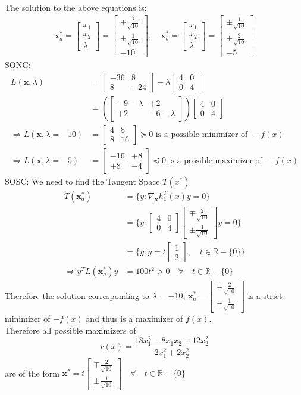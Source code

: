 \documentclass[a4paper,11pt]{article}
\newcommand{\V}[1]{\boldsymbol{#1}}
\newcommand{\mat}[1]{\begin{bmatrix}#1\end{bmatrix}}
\begin{document}
The solution to the above equations is:
\begin{align*}
 \V{x}^*_a = \mat{x_1\\x_2\\\lambda}=\mat{\mp\frac{2}{\sqrt{10}} \\ \pm\frac{1}{\sqrt{10}}\\-10},\quad 
 \V{x}^*_b =\mat{x_1\\x_2\\\lambda}=\mat{\pm\frac{1}{\sqrt{10}} \\ \pm\frac{2}{\sqrt{10}}\\-5}
\end{align*}
SONC:
\begin{align*}
 L(\V{x},\lambda) &=\mat{-36& 8\\8& -24} -\lambda\mat{4&0\\0&4}\\
 & = (\mat{-9-\lambda& +2\\+2& -6-\lambda})\mat{4&0\\0&4}\\
 \Rightarrow L(\V{x},\lambda=-10) &= \mat{4& 8\\8& 16} \succcurlyeq 0 \text{ is a possible minimizer of } -f(x)\\
 \Rightarrow L(\V{x},\lambda=-5) &= \mat{-16& +8\\+8& -4}\preccurlyeq 0 \text{ is a possible maximizer of } -f(x)
\end{align*}
SOSC: We need to find the Tangent Space $T(x^*)$
\begin{align*}
T(\V{x}^*_a) & = \{y: \nabla_{\V{x}}h_1^T(x)y = 0   \}\\
& = \{y: \mat{4&0\\0&4}\mat{\mp\frac{2}{\sqrt{10}} \\ \pm\frac{1}{\sqrt{10}}}y = 0   \}\\
&=\{y: y = t\mat{1\\2},\quad t\in\mathbb{R}-\{0\}\}\\
\Rightarrow y^TL(\V{x}^*_a)y &= 100t^2 > 0 \quad \forall \quad t\in\mathbb{R}-\{0\}
\end{align*}
Therefore the solution corresponding to $\lambda=-10$, $\V{x}^*_a =\mat{\mp\frac{2}{\sqrt{10}} \\ \pm\frac{1}{\sqrt{10}}}$ is a strict minimizer of $-f(x)$ and thus is a maximizer of $f(x)$.\\ 

\noindent Therefore all possible maximizers of $$r(x) = \frac{18x_1^2 - 8x_1x_2 +12x_2^2}{2x_1^2 + 2x_2^2}$$
are of the form $\V{x}^* =t\mat{\mp\frac{2}{\sqrt{10}} \\ \pm\frac{1}{\sqrt{10}}} \quad \forall \quad t \in \mathbb{R}-\{0\}$
\end{document}

